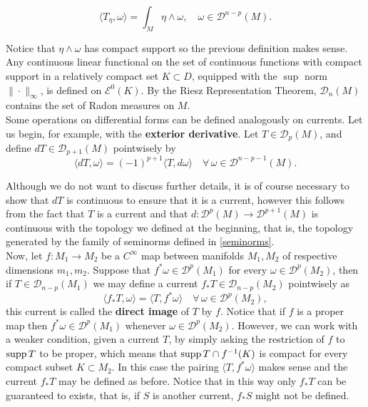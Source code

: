 $$\langle T_\eta , \omega \rangle = \int_M \eta \wedge \omega, \quad \omega \in \mathcal{D}^{n-p}(M).$$

Notice that $\eta \wedge \omega$ has compact support so the previous definition makes sense.\\

Any continuous linear functional on the set of continuous functions with compact support in a relatively compact set $K\subset D$, equipped with the $\sup$ norm $\|\cdot\|_\infty$, is defined on $\mathcal{E}^0(K)$. By the Riesz Representation Theorem, $\mathcal{D}_n(M)$ contains the set of Radon measures on $M$.\\

Some operations on differential forms can be defined analogously on currents. Let us begin, for example, with the {\bf exterior derivative}. Let $T\in \mathcal{D}_p(M)$, and define $dT\in \mathcal{D}_{p+1}(M)$ pointwisely by
$$\langle dT,\omega\rangle = (-1)^{p+1}\langle T , d\omega \rangle \quad \forall\, \omega \in \mathcal{D}^{n-p-1}(M).$$

Although we do not want to discuss further details, it is of course necessary to show that $dT$ is continuous to ensure that it is a current, however this follows from the fact that $T$ is a current and that $d:\mathcal{D}^p(M)\rightarrow \mathcal{D}^{p+1}(M)$ is continuous with the topology we defined at the beginning, that is, the topology generated by the family of seminorms defined in \ref{seminorms}.\\

Now, let $f:M_1\rightarrow M_2$ be a $C^\infty$ map between manifolds $M_1,M_2$ of respective dimensions $m_1,m_2$. Suppose that $f^*\omega\in \mathcal{D}^p(M_1)$ for every $\omega\in \mathcal{D}^p(M_2)$, then if $T\in \mathcal{D}_{n-p}(M_1)$ we may define a current $f_*T\in \mathcal{D}_{n-p}(M_2)$ pointwisely as
$$\langle f_*T,\omega\rangle = \langle T,f^*\omega\rangle \quad \forall \,\omega \in \mathcal{D}^p(M_2),$$
this current is called the {\bf direct image} of $T$ by $f$. Notice that if $f$ is a proper map then $f^*\omega\in \mathcal{D}^p(M_1)$ whenever $\omega\in \mathcal{D}^p(M_2)$. However, we can work with a weaker condition, given a current $T$, by simply asking the restriction of $f$ to $\text{supp} \,T$ to be proper, which means that $\text{supp}\, T \cap f^{-1}(K)$ is compact for every compact subset $K\subset M_2$. In this case the pairing $\langle T, f^{*}\omega\rangle$ makes sense and the current $f_*T$ may be defined as before. Notice that in this way only $f_*T$ can be guaranteed to exists, that is, if $S$ is another current, $f_*S$ might not be defined.\\

